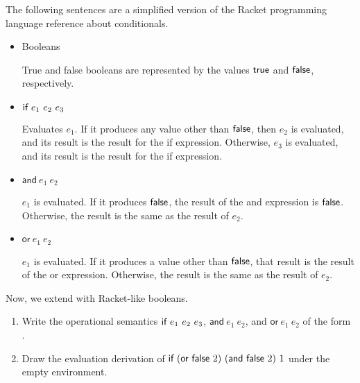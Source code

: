 \begin{exercise}

  The following sentences are a simplified version of the Racket programming
  language reference about
  conditionals.

\newcommand{\eand}[2]{\textsf{and}\ #1\ #2}
\newcommand{\eor}[2]{\textsf{or}\ #1\ #2}

\begin{itemize}
  \item Booleans

    True and false booleans are represented by the values $\textsf{true}$ and
    $\textsf{false}$, respectively.

  \item $\textsf{if}\ e_1\ e_2\ e_3$

    Evaluates $e_1$. If it produces any value other than $\textsf{false}$, then $e_2$ is
    evaluated, and its result is the result for the \textsf{if} expression.
    Otherwise, $e_3$ is evaluated, and its result is the result for the
    \textsf{if} expression.

  \item $\eand{e_1}{e_2}$

    $e_1$ is evaluated. If it produces $\textsf{false}$, the result of the \textsf{and}
    expression is $\textsf{false}$. Otherwise, the result is the same as the result of
    $e_2$.

  \item $\eor{e_1}{e_2}$

    $e_1$ is evaluated. If it produces a value other than $\textsf{false}$, that result
    is the result of the \textsf{or} expression. Otherwise, the result is the
    same as the result of $e_2$.

\end{itemize}

Now, we extend \lang with Racket-like booleans.

\begin{enumerate}
  \item
    Write the operational semantics
    $\textsf{if}\ e_1\ e_2\ e_3$, $\eand{e_1}{e_2}$, and $\eor{e_1}{e_2}$
    of the form .
  \item
    Draw the evaluation derivation of
    $\eif{(\eor{\false}{2})}{(\eand{\false}{2})}{1}$
    under the empty environment.
\end{enumerate}

\end{exercise}

